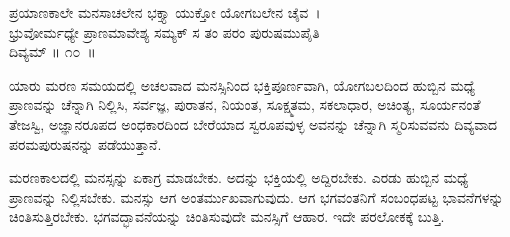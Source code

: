 \begin{shloka}
ಪ್ರಯಾಣಕಾಲೇ ಮನಸಾಚಲೇನ ಭಕ್ತ್ಯಾ ಯುಕ್ತೋ ಯೋಗಬಲೇನ ಚೈವ~।\\ಭ್ರುವೋರ್ಮಧ್ಯೇ ಪ್ರಾಣಮಾವೇಶ್ಯ ಸಮ್ಯಕ್ ಸ ತಂ ಪರಂ ಪುರುಷಮುಪೈತಿ\\ ದಿವ್ಯಮ್ \hfill॥ ೧೦~॥
\end{shloka}

\begin{artha}
ಯಾರು ಮರಣ ಸಮಯದಲ್ಲಿ ಅಚಲವಾದ ಮನಸ್ಸಿನಿಂದ ಭಕ್ತಿಪೂರ್ಣವಾಗಿ, ಯೋಗಬಲದಿಂದ ಹುಬ್ಬಿನ ಮಧ್ಯೆ ಪ್ರಾಣವನ್ನು ಚೆನ್ನಾಗಿ ನಿಲ್ಲಿಸಿ, ಸರ್ವಜ್ಞ, ಪುರಾತನ, ನಿಯಂತ, ಸೂಕ್ಷ್ಮತಮ, ಸಕಲಾಧಾರ, ಅಚಿಂತ್ಯ, ಸೂರ್ಯನಂತೆ ತೇಜಸ್ವಿ, ಅಜ್ಞಾನರೂಪದ ಅಂಧಕಾರದಿಂದ ಬೇರೆಯಾದ ಸ್ವರೂಪವುಳ್ಳ ಅವನನ್ನು ಚೆನ್ನಾಗಿ ಸ್ಮರಿಸುವವನು ದಿವ್ಯವಾದ ಪರಮಪುರುಷನನ್ನು ಪಡೆಯುತ್ತಾನೆ.
\end{artha}

ಮರಣಕಾಲದಲ್ಲಿ ಮನಸ್ಸನ್ನು ಏಕಾಗ್ರ ಮಾಡಬೇಕು. ಅದನ್ನು ಭಕ್ತಿಯಲ್ಲಿ ಅದ್ದಿರಬೇಕು. ಎರಡು ಹುಬ್ಬಿನ ಮಧ್ಯೆ ಪ್ರಾಣವನ್ನು ನಿಲ್ಲಿಸಬೇಕು. ಮನಸ್ಸು ಆಗ ಅಂತರ್ಮುಖವಾಗುವುದು. ಆಗ ಭಗವಂತನಿಗೆ ಸಂಬಂಧಪಟ್ಟ ಭಾವನೆಗಳನ್ನು ಚಿಂತಿಸುತ್ತಿರಬೇಕು. ಭಗವದ್ಭಾವನೆಯನ್ನು ಚಿಂತಿಸುವುದೇ ಮನಸ್ಸಿಗೆ ಆಹಾರ. ಇದೇ ಪರಲೋಕಕ್ಕೆ ಬುತ್ತಿ.

